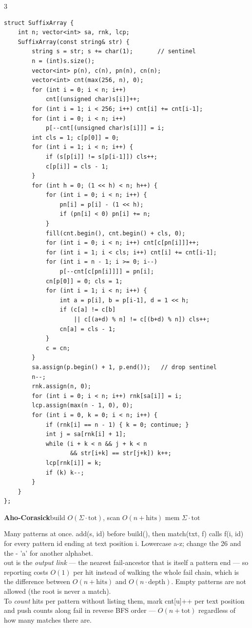 \documentclass[9pt,a4paper]{extarticle}
\newcommand{\entry}[3]{%
  \addcontentsline{toc}{subsection}{#1}%
  \vspace{0.8ex}%
  \noindent\colorbox{hdbg}{\parbox{\dimexpr\columnwidth-2\fboxsep}{%
    \strut\textbf{#1}\hfill{\footnotesize\textsf{#2}}}}\par
  \vspace{0.4ex}%
  {\footnotesize #3\par}%
}
\newcommand{\code}[1]{{\ttfamily\small #1}}
\begin{document}
\begin{multicols*}{3}
\begin{lstlisting}
struct SuffixArray {
    int n; vector<int> sa, rnk, lcp;
    SuffixArray(const string& str) {
        string s = str; s += char(1);       // sentinel
        n = (int)s.size();
        vector<int> p(n), c(n), pn(n), cn(n);
        vector<int> cnt(max(256, n), 0);
        for (int i = 0; i < n; i++)
            cnt[(unsigned char)s[i]]++;
        for (int i = 1; i < 256; i++) cnt[i] += cnt[i-1];
        for (int i = 0; i < n; i++)
            p[--cnt[(unsigned char)s[i]]] = i;
        int cls = 1; c[p[0]] = 0;
        for (int i = 1; i < n; i++) {
            if (s[p[i]] != s[p[i-1]]) cls++;
            c[p[i]] = cls - 1;
        }
        for (int h = 0; (1 << h) < n; h++) {
            for (int i = 0; i < n; i++) {
                pn[i] = p[i] - (1 << h);
                if (pn[i] < 0) pn[i] += n;
            }
            fill(cnt.begin(), cnt.begin() + cls, 0);
            for (int i = 0; i < n; i++) cnt[c[pn[i]]]++;
            for (int i = 1; i < cls; i++) cnt[i] += cnt[i-1];
            for (int i = n - 1; i >= 0; i--)
                p[--cnt[c[pn[i]]]] = pn[i];
            cn[p[0]] = 0; cls = 1;
            for (int i = 1; i < n; i++) {
                int a = p[i], b = p[i-1], d = 1 << h;
                if (c[a] != c[b]
                    || c[(a+d) % n] != c[(b+d) % n]) cls++;
                cn[a] = cls - 1;
            }
            c = cn;
        }
        sa.assign(p.begin() + 1, p.end());   // drop sentinel
        n--;
        rnk.assign(n, 0);
        for (int i = 0; i < n; i++) rnk[sa[i]] = i;
        lcp.assign(max(n - 1, 0), 0);
        for (int i = 0, k = 0; i < n; i++) {
            if (rnk[i] == n - 1) { k = 0; continue; }
            int j = sa[rnk[i] + 1];
            while (i + k < n && j + k < n
                   && str[i+k] == str[j+k]) k++;
            lcp[rnk[i]] = k;
            if (k) k--;
        }
    }
};
\end{lstlisting}

\entry{Aho-Corasick}{build $O(\Sigma \cdot \mathrm{tot})$, scan $O(n + \mathrm{hits})$ \quad mem $\Sigma \cdot \mathrm{tot}$}{%
Many patterns at once. \code{add(s, id)} before \code{build()}, then \code{match(txt, f)}
calls \code{f(i, id)} for every pattern \code{id} ending at text position \code{i}.
Lowercase \code{a-z}; change the 26 and the \code{- 'a'} for another
alphabet.\\[0.3ex]
\code{out} is the \emph{output link} --- the nearest fail-ancestor that is itself a
pattern end --- so reporting costs $O(1)$ per hit instead of walking the whole fail
chain, which is the difference between $O(n + \mathrm{hits})$ and $O(n \cdot
\mathrm{depth})$. Empty patterns are not allowed (the root is never a match).\\[0.3ex]
To \emph{count} hits per pattern without listing them, mark \code{cnt[u]++} per text
position and push counts along \code{fail} in reverse BFS order --- $O(n +
\mathrm{tot})$ regardless of how many matches there are.}


\end{multicols*}
\end{document}
